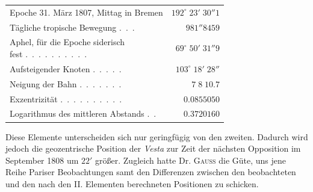 \begin{center}\begin{tabular}{lr}
Epoche 31. März 1807, Mittag in Bremen  & $192^\circ\;23'\;30''1$ \\
Tägliche tropische Bewegung .\ .\ . & $981''8459$ \\
\shortstack[l]{Aphel, für die Epoche siderisch\\fest} .\ .\ .\ .\ .\ .\ .\ .\ .\ . & $69^\circ\;50'\;31''9$ \\
Aufsteigender Knoten .\ .\ .\ .\ . & $103^\circ\;18'\;28''$ \\
Neigung der Bahn .\ .\ .\ .\ .\ .\ . & $7\;8\;10.7$ \\
Exzentrizität .\ .\ .\ .\ .\ .\ .\ .\ .\ . & $0.0855050$ \\
Logarithmus des mittleren Abstands .\ . & $0.3720160$ \\
\end{tabular}\end{center}
\par\indent Diese Elemente unterscheiden sich nur geringfügig von den zweiten. Dadurch wird jedoch die geozentrische Position der \emph{Vesta} zur Zeit der nächsten Opposition im September 1808 um $22'$ größer. Zugleich hatte Dr. \textsc{Gauss} die Güte, uns jene Reihe Pariser Beobachtungen samt den Differenzen zwischen den beobachteten und den nach den II. Elementen berechneten Positionen zu schicken.


